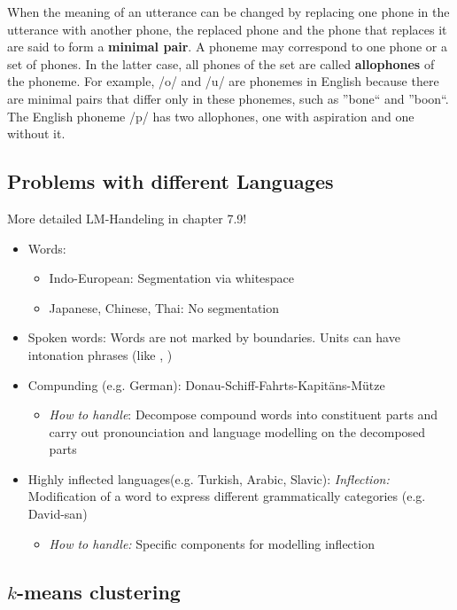 \documentclass[11pt]{article}
\begin{document}
When the meaning of an utterance can be changed by replacing one phone in the utterance with another phone, the replaced phone and the phone that replaces it are said to form a \textbf{minimal pair}.
A phoneme may correspond to one phone or a set of phones. In the latter case, all phones of the set are called \textbf{allophones} of the phoneme.
For example, /o/ and /u/ are phonemes in English because there are minimal pairs that differ only in these phonemes, such as ''bone`` and ''boon``. The English phoneme /p/ has two allophones, one with aspiration and one without it.

\subsection{Problems with different Languages}
More detailed LM-Handeling in chapter 7.9!
\begin{itemize}
\item{Words:}
\begin{itemize}
\item{Indo-European:} Segmentation via whitespace
\item{Japanese, Chinese, Thai:} No segmentation
\end{itemize}

\item{Spoken words:} Words are not marked by boundaries. Units can have intonation phrases (like , )

\item{Compunding (e.g. German):} Donau-Schiff-Fahrts-Kapitäns-Mütze 
\begin{itemize}
\item \emph{How to handle}: Decompose compound words into constituent parts and carry out pronounciation and language modelling on the decomposed parts
\end{itemize}
 
 \item Highly inflected languages(e.g. Turkish, Arabic, Slavic): \emph{Inflection:} Modification of a word to express different grammatically categories (e.g. David-san) 
 \begin{itemize}
 \item \emph{How to handle:} Specific components for modelling inflection
 \end{itemize}

\end{itemize}


\subsection{$k$-means clustering}
\end{document}
